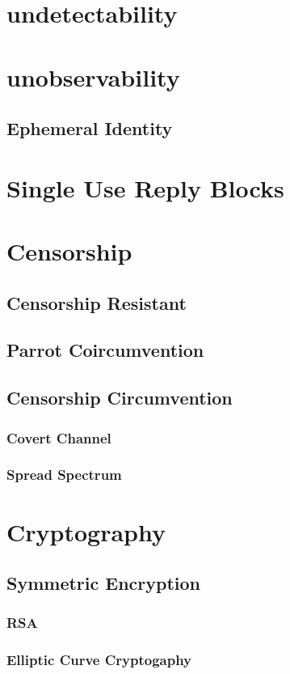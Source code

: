 \section{undetectability}
\section{unobservability}

\subsection{Ephemeral Identity}
\section{Single Use Reply Blocks}
\section{Censorship}
\subsection{Censorship Resistant}
\subsection{Parrot Coircumvention}
\subsection{Censorship Circumvention}
\subsubsection{Covert Channel}
\subsubsection{Spread Spectrum}

\section{Cryptography}
\subsection{Symmetric Encryption}
\subsubsection{RSA}
\subsubsection{Elliptic Curve Cryptogaphy}

